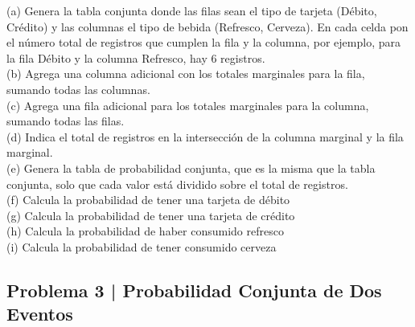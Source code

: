 \documentclass{article}
\begin{document}
\break
\noindent
(a) Genera la tabla conjunta donde las filas sean el tipo de tarjeta (Débito, Crédito) y las columnas el tipo de bebida (Refresco, Cerveza). En cada celda pon el número total de registros que cumplen la fila y la columna, por ejemplo, para la fila Débito y la columna Refresco, hay 6 registros.
\\[6pt]
(b) Agrega una columna adicional con los totales marginales para la fila, sumando todas las columnas.
\\[6pt]
(c) Agrega una fila adicional para los totales marginales para la columna, sumando todas las filas.
\\[6pt]
(d) Indica el total de registros en la intersección de la columna marginal y la fila marginal.
\\[6pt]
(e) Genera la tabla de probabilidad conjunta, que es la misma que la tabla conjunta, solo que cada valor está dividido sobre el total de registros.
\\[6pt]
(f) Calcula la probabilidad de tener una tarjeta de débito
\\[6pt]
(g) Calcula la probabilidad de tener una tarjeta de crédito
\\[6pt]
(h) Calcula la probabilidad de haber consumido refresco
\\[6pt]
(i) Calcula la probabilidad de tener consumido cerveza

\clearpage

\subsection*{Problema 3 | Probabilidad Conjunta de Dos Eventos}
\end{document}
